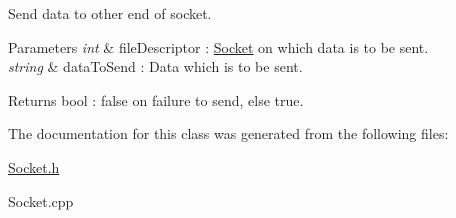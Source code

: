Send data to other end of socket. 


\begin{DoxyParams}{Parameters}
{\em \textquotesingle{}int} & file\+Descriptor\textquotesingle{} \+: \hyperlink{classSocket}{Socket} on which data is to be sent. \\
\hline
{\em \textquotesingle{}string} & data\+To\+Send\textquotesingle{} \+: Data which is to be sent. \\
\hline
\end{DoxyParams}
\begin{DoxyReturn}{Returns}
\textquotesingle{}bool\textquotesingle{} \+: false on failure to send, else true. 
\end{DoxyReturn}


The documentation for this class was generated from the following files\+:\begin{DoxyCompactItemize}
\item 
\hyperlink{Socket_8h}{Socket.\+h}\item 
Socket.\+cpp\end{DoxyCompactItemize}

